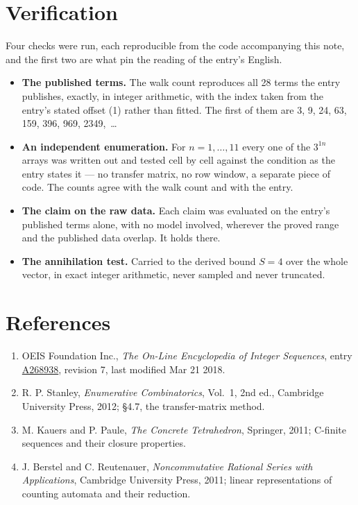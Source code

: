 \documentclass[11pt]{article}
\theoremstyle{definition}
\begin{document}
\section{Verification}

Four checks were run, each reproducible from the code accompanying this note, and the first two are what pin the reading of the entry's English.

\begin{itemize}

\item {\bfseries The published terms.} The walk count reproduces all 28 terms the entry publishes, exactly, in integer arithmetic, with the index taken from the entry's stated offset (1) rather than fitted. The first of them are 3, 9, 24, 63, 159, 396, 969, 2349,~\dots

\item {\bfseries An independent enumeration.} For $n = 1,\dots,11$ every one of the $3^{1n}$ arrays was written out and tested cell by cell against the condition as the entry states it --- no transfer matrix, no row window, a separate piece of code. The counts agree with the walk count and with the entry.

\item {\bfseries The claim on the raw data.} Each claim was evaluated on the entry's published terms alone, with no model involved, wherever the proved range and the published data overlap. It holds there.

\item {\bfseries The annihilation test.} Carried to the derived bound $S = 4$ over the whole vector, in exact integer arithmetic, never sampled and never truncated.

\end{itemize}

\section{References}

\begin{enumerate}

\item OEIS Foundation Inc., \emph{The On-Line Encyclopedia of Integer Sequences}, entry \href{https://oeis.org/A268938}{A268938}, revision 7, last modified Mar 21 2018.

\item R. P. Stanley, \emph{Enumerative Combinatorics}, Vol.~1, 2nd ed., Cambridge University Press, 2012; \S4.7, the transfer-matrix method.

\item M. Kauers and P. Paule, \emph{The Concrete Tetrahedron}, Springer, 2011; C-finite sequences and their closure properties.

\item J. Berstel and C. Reutenauer, \emph{Noncommutative Rational Series with Applications}, Cambridge University Press, 2011; linear representations of counting automata and their reduction.

\end{enumerate}
\end{document}
